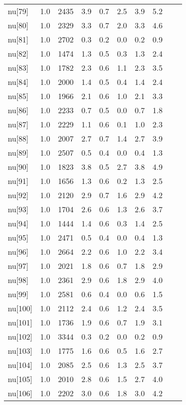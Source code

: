 \begin{longtable}{lrrrrrrr p{} | p{} |}
  nu[79] & 1.0 & 2435 & 3.9 & 0.7 & 2.5 & 3.9 & 5.2 \\ 
  nu[80] & 1.0 & 2329 & 3.3 & 0.7 & 2.0 & 3.3 & 4.6 \\ 
  nu[81] & 1.0 & 2702 & 0.3 & 0.2 & 0.0 & 0.2 & 0.9 \\ 
  nu[82] & 1.0 & 1474 & 1.3 & 0.5 & 0.3 & 1.3 & 2.4 \\ 
  nu[83] & 1.0 & 1782 & 2.3 & 0.6 & 1.1 & 2.3 & 3.5 \\ 
  nu[84] & 1.0 & 2000 & 1.4 & 0.5 & 0.4 & 1.4 & 2.4 \\ 
  nu[85] & 1.0 & 1966 & 2.1 & 0.6 & 1.0 & 2.1 & 3.3 \\ 
  nu[86] & 1.0 & 2233 & 0.7 & 0.5 & 0.0 & 0.7 & 1.8 \\ 
  nu[87] & 1.0 & 2229 & 1.1 & 0.6 & 0.1 & 1.0 & 2.3 \\ 
  nu[88] & 1.0 & 2007 & 2.7 & 0.7 & 1.4 & 2.7 & 3.9 \\ 
  nu[89] & 1.0 & 2507 & 0.5 & 0.4 & 0.0 & 0.4 & 1.3 \\ 
  nu[90] & 1.0 & 1823 & 3.8 & 0.5 & 2.7 & 3.8 & 4.9 \\ 
  nu[91] & 1.0 & 1656 & 1.3 & 0.6 & 0.2 & 1.3 & 2.5 \\ 
  nu[92] & 1.0 & 2120 & 2.9 & 0.7 & 1.6 & 2.9 & 4.2 \\ 
  nu[93] & 1.0 & 1704 & 2.6 & 0.6 & 1.3 & 2.6 & 3.7 \\ 
  nu[94] & 1.0 & 1444 & 1.4 & 0.6 & 0.3 & 1.4 & 2.5 \\ 
  nu[95] & 1.0 & 2471 & 0.5 & 0.4 & 0.0 & 0.4 & 1.3 \\ 
  nu[96] & 1.0 & 2664 & 2.2 & 0.6 & 1.0 & 2.2 & 3.4 \\ 
  nu[97] & 1.0 & 2021 & 1.8 & 0.6 & 0.7 & 1.8 & 2.9 \\ 
  nu[98] & 1.0 & 2361 & 2.9 & 0.6 & 1.8 & 2.9 & 4.0 \\ 
  nu[99] & 1.0 & 2581 & 0.6 & 0.4 & 0.0 & 0.6 & 1.5 \\ 
  nu[100] & 1.0 & 2112 & 2.4 & 0.6 & 1.2 & 2.4 & 3.5 \\ 
  nu[101] & 1.0 & 1736 & 1.9 & 0.6 & 0.7 & 1.9 & 3.1 \\ 
  nu[102] & 1.0 & 3344 & 0.3 & 0.2 & 0.0 & 0.2 & 0.9 \\ 
  nu[103] & 1.0 & 1775 & 1.6 & 0.6 & 0.5 & 1.6 & 2.7 \\ 
  nu[104] & 1.0 & 2085 & 2.5 & 0.6 & 1.3 & 2.5 & 3.7 \\ 
  nu[105] & 1.0 & 2010 & 2.8 & 0.6 & 1.5 & 2.7 & 4.0 \\ 
  nu[106] & 1.0 & 2202 & 3.0 & 0.6 & 1.8 & 3.0 & 4.2 \\ 

\end{longtable}
